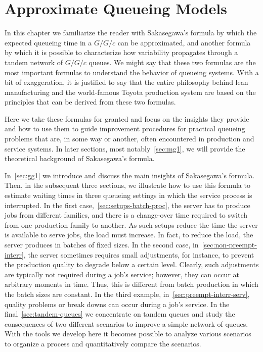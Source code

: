  





\chapter{Approximate Queueing Models}
\label{cha:approximate-models}



In this chapter we familiarize the reader with Sakasegawa's formula by which the expected queueing time in a $G/G/c$ can be approximated, and another formula by which it is possible to characterize how variability propagates through a tandem network of $G/G/c$ queues.
We might say that these two formulas are the most important formulas to understand the behavior of queueing systems.
With a bit of exaggeration, it is justified to say that the entire philosophy behind lean manufacturing and the world-famous Toyota production system are based on the principles that can be derived from these two formulas.

Here we take these formulas for granted and focus on the insights they provide and how to use them to guide improvement procedures for practical queueing problems that are, in some way or another, often encountered in production and service systems.
In later sections, most notably~\cref{sec:mg1}, we will provide the theoretical background of Sakasegawa's formula.


In~\cref{sec:gg1} we introduce and discuss the main insights of Sakasegawa's formula.
Then, in the subsequent three sections, we illustrate how to use this formula to estimate waiting times in three queueing settings in which the service process is interrupted.
In the first case,~\cref{sec:setups-batch-proc}, the server has to produce jobs from different families, and there is a change-over time required to switch from one production family to another.
As such setups reduce the time the server is available to serve jobs, the load must increase.
In fact, to reduce the load, the server produces in batches of fixed sizes.
In the second case, in~\cref{sec:non-preempt-interr}, the server sometimes requires small adjustments, for instance, to prevent the production quality to degrade below a certain level.
Clearly, such adjustments are typically not required during a job's service; however, they can occur at arbitrary moments in time.
Thus, this is different from batch production in which the batch sizes are constant.
In the third example, in~\cref{sec:preempt-interr-serv}, quality problems or break downs can occur during a job's service.
In the final~\cref{sec:tandem-queues} we concentrate on tandem queues and study the consequences of two different scenarios to improve a simple network of queues.
With the tools we develop here it becomes possible to analyze various scenarios to organize a process and quantitatively compare the scenarios.

